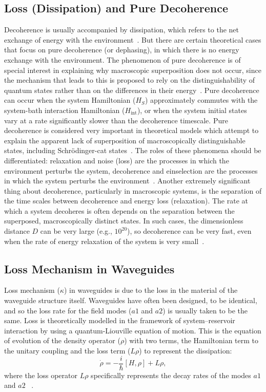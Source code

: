 \subsection{Loss (Dissipation) and Pure Decoherence}
Decoherence is usually accompanied by dissipation, which refers to the net exchange of energy with the environment~\cite{Alicki2004}. But there are certain theoretical cases that focus on pure decoherence (or dephasing), in which there is no energy exchange with the environment. The phenomenon of pure decoherence is of special interest in explaining why macroscopic superposition does not occur, since the mechanism that leads to this is proposed to rely on the distinguishability of quantum states rather than on the differences in their energy~\cite{Alicki2004}. Pure decoherence can occur when the system Hamiltonian ($H_{S}$)  approximately commutes with the system-bath interaction Hamiltonian  ($H_{\mathrm{int}}$), or when the system initial states vary at a rate significantly slower than the decoherence timescale. Pure decoherence is considered very important in theoretical models which attempt to explain the apparent lack of superposition of macroscopically distinguishable states, including Schr\"{o}dinger-cat states~\cite{Alicki2004}.
The roles of these phenomena should be differentiated: relaxation and noise (loss) are the processes in which the environment perturbs the system, decoherence and einselection are the processes in which the system perturbs the environment~\cite{Zurek2003}.
Another extremely significant thing about decoherence, particularly in macroscopic systems, is the separation of the time scales between decoherence and energy loss (relaxation). The rate at which a system decoheres is often depends on the separation between the superposed, macroscopically distinct states. In such cases, the dimensionless distance  $D$  can be very large   (e.g., $10^{20}$), so decoherence can be very fast, even when the rate of energy relaxation of the system is very small~\cite{Schlosshauer2005}.

\subsection{Loss Mechanism in Waveguides}
Loss mechanism ($\kappa$) in waveguides is due to the loss in the material of the waveguide structure itself. Waveguides have often been designed, to be identical, and so the loss rate for the field modes ($a1$ and $a2$) is usually taken to be the same. Loss is theoretically modelled in the framework of system--reservoir interaction by using a quantum-Liouville equation of motion.
This is the equation of evolution of the density operator ($\rho$) with two terms, the Hamiltonian term to the unitary coupling and the loss term  ($L\rho$) to represent the dissipation:
\begin{equation}
	\dot{\rho} = -\frac{i}{\hbar}[H, \rho] + L\rho,
\end{equation}
where the loss operator $L\rho$ specifically represents the decay rates of the modes $a1$ and $a2$~\cite{Rai2010,BreuerPetruccione2002,GardinerZoller2004,WallsMilburn}
.

